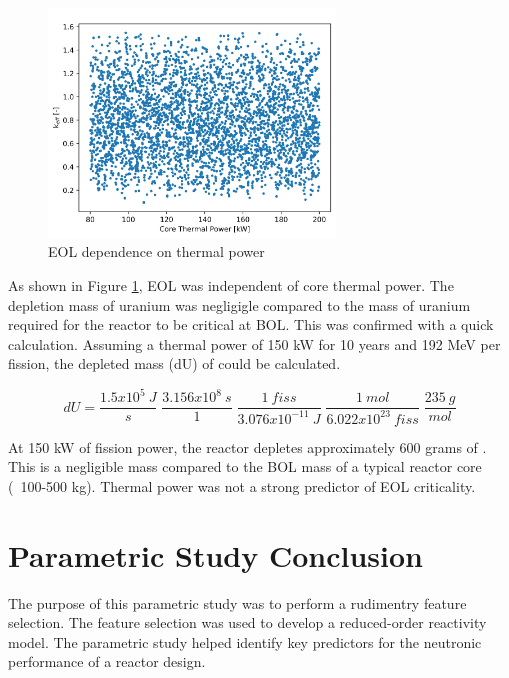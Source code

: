 \begin{figure}[h]
    \centering
    \includegraphics[width=3in]{../images/keff_vs_power.png}
\caption{EOL \keff dependence on thermal power}
\label{fig:eol_keff_vs_power}
\end{figure}

As shown in Figure \ref{fig:eol_keff_vs_power}, EOL \keff was independent of core
thermal power. The depletion mass of uranium was negligigle compared to the mass 
of uranium required for the reactor to be critical at BOL. This was confirmed
with a quick calculation. Assuming a thermal power of 150 kW for 10 years and
192 MeV per fission, the depleted mass (dU) of \uran could be calculated.

\begin{equation}
    dU = \frac{1.5x10^5\:J}{s}\;\frac{3.156x10^8\:s}{1}\;\frac{1\:
    fiss}{3.076x10^{-11}\:J}\;\frac{1\:mol}{6.022x10^{23}\:fiss}\;\frac{235\:
    g}{mol}
\end{equation}

At 150 kW of fission power, the reactor depletes approximately 600 grams of
\uran. This is a negligible mass compared to the BOL mass of a typical reactor
core (~100-500 kg). Thermal power was not a strong predictor of EOL criticality.

\section{Parametric Study Conclusion}
The purpose of this parametric study was to perform a rudimentry feature
selection. The feature selection was used to develop a reduced-order reactivity
model. The parametric study helped identify key predictors
for the neutronic performance of a reactor design.

